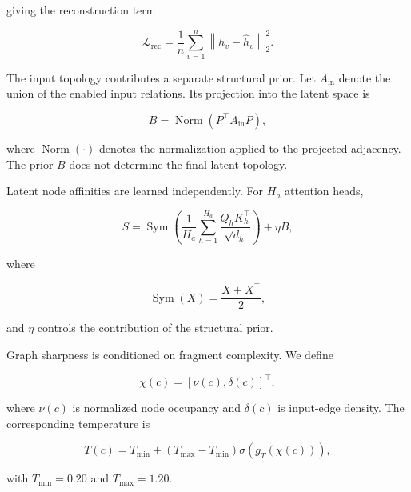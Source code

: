 \documentclass[authoryear,final,5p,times,twocolumn]{elsarticle}
\theoremstyle{plain}
\begin{document}
giving the reconstruction term

\begin{equation}
\label{eq:reconstruction_loss}
\mathcal{L}_{\mathrm{rec}}
=
\frac{1}{n}
\sum_{v=1}^{n}
\left\|
    h_v-\widehat{h}_v
\right\|_2^2.
\end{equation}

The input topology contributes a separate structural prior. Let
$A_{\mathrm{in}}$ denote the union of the enabled input relations. Its
projection into the latent space is

\begin{equation}
\label{eq:structural_prior}
B
=
\operatorname{Norm}
\left(
    P^{\top}
    A_{\mathrm{in}}
    P
\right),
\end{equation}

where $\operatorname{Norm}(\cdot)$ denotes the normalization applied to the
projected adjacency. The prior $B$ does not determine the final latent
topology.

Latent node affinities are learned independently. For $H_a$ attention heads,

\begin{equation}
\label{eq:latent_score}
S
=
\operatorname{Sym}
\left(
    \frac{1}{H_a}
    \sum_{h=1}^{H_a}
    \frac{
        Q_hK_h^{\top}
    }{
        \sqrt{d_h}
    }
\right)
+
\eta B,
\end{equation}

where

\begin{equation}
\operatorname{Sym}(X)
=
\frac{X+X^{\top}}{2},
\end{equation}

and $\eta$ controls the contribution of the structural prior.

Graph sharpness is conditioned on fragment complexity. We define

\begin{equation}
\chi(c)
=
[
    \nu(c),
    \delta(c)
]^{\top},
\end{equation}

where $\nu(c)$ is normalized node occupancy and $\delta(c)$ is input-edge
density. The corresponding temperature is

\begin{equation}
\label{eq:adaptive_temperature}
T(c)
=
T_{\min}
+
\left(
    T_{\max}-T_{\min}
\right)
\sigma
\left(
    g_T(\chi(c))
\right),
\end{equation}

with $T_{\min}=0.20$ and $T_{\max}=1.20$.
\end{document}
